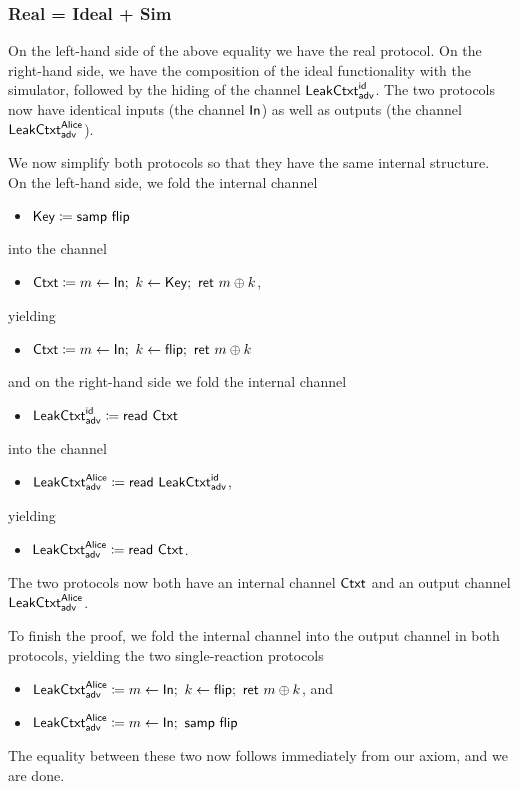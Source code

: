 \subsubsection{Real = Ideal + Sim}
On the left-hand side of the above equality we have the real protocol. On the right-hand side, we have the composition of the ideal functionality with the simulator, followed by the hiding of the channel $\mathsf{LeakCtxt}^{\mathsf{id}}_{\mathsf{adv}}$. The two protocols now have identical inputs (the channel $\mathsf{In}$) as well as outputs (the channel $\mathsf{LeakCtxt}^{\mathsf{Alice}}_{\mathsf{adv}}$).

We now simplify both protocols so that they have the same internal structure. On the left-hand side, we fold the internal channel
\begin{itemize}
\item $\mathsf{Key} \coloneqq \mathsf{samp} \ \mathsf{flip}$
\end{itemize}
into the channel
\begin{itemize}
\item $\mathsf{Ctxt} \coloneqq m \leftarrow \mathsf{In}; \ k \leftarrow \mathsf{Key}; \ \mathsf{ret} \ m \oplus k$,
\end{itemize}
yielding
\begin{itemize}
\item $\mathsf{Ctxt} \coloneqq m \leftarrow \mathsf{In}; \ k \leftarrow \mathsf{flip}; \ \mathsf{ret} \ m \oplus k$
\end{itemize}
and on the right-hand side we fold the internal channel
\begin{itemize}
\item $\mathsf{LeakCtxt}^{\mathsf{id}}_{\mathsf{adv}} \coloneqq \mathsf{read} \ \mathsf{Ctxt}$
\end{itemize}
into the channel
\begin{itemize}
\item $\mathsf{LeakCtxt}^{\mathsf{Alice}}_{\mathsf{adv}} \coloneqq \mathsf{read} \ \mathsf{LeakCtxt}^{\mathsf{id}}_{\mathsf{adv}}$,
\end{itemize}
yielding
\begin{itemize}
\item $\mathsf{LeakCtxt}^{\mathsf{Alice}}_{\mathsf{adv}} \coloneqq \mathsf{read} \ \mathsf{Ctxt}$.
\end{itemize}
The two protocols now both have an internal channel $\mathsf{Ctxt}$ and an output channel $\mathsf{LeakCtxt}^{\mathsf{Alice}}_{\mathsf{adv}}$.

To finish the proof, we fold the internal channel into the output channel in both protocols, yielding the two single-reaction protocols
\begin{itemize}
\item $\mathsf{LeakCtxt}^{\mathsf{Alice}}_{\mathsf{adv}} \coloneqq m \leftarrow \mathsf{In}; \ k \leftarrow \mathsf{flip}; \ \mathsf{ret} \ m \oplus k$, and
\item $\mathsf{LeakCtxt}^{\mathsf{Alice}}_{\mathsf{adv}} \coloneqq m \leftarrow \mathsf{In}; \ \mathsf{samp} \ \mathsf{flip}$
\end{itemize}
The equality between these two now follows immediately from our axiom, and we are done.

